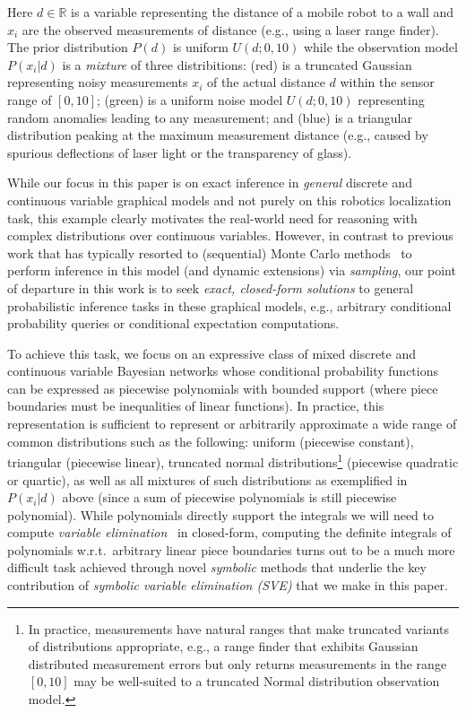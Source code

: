\documentclass[letterpaper]{article}
\newcommand{\R}{\mathbb{R}}
\begin{document}
Here $d \in \R$ is a variable representing the distance of a
mobile robot to a wall and $x_i$ are the observed measurements of
distance (e.g., using a laser range finder).  The prior distribution
$P(d)$ is uniform $U(d;0,10)$ while the observation model
$P(x_i|d)$ is a \emph{mixture} of three distribitions: (red) is a
truncated Gaussian 
representing noisy measurements $x_i$ of the actual
distance $d$ within the sensor range of $[0,10]$; 
(green) is a uniform noise model $U(d;0,10)$
representing random anomalies leading to any measurement; and
(blue) is a triangular distribution peaking at the maximum measurement
distance (e.g., caused by spurious deflections of laser light or the 
transparency of glass).

While our focus in this paper is on exact inference in \emph{general}
discrete and continuous variable graphical models and not purely on
this robotics localization task, this example clearly motivates the
real-world need for reasoning with complex distributions over
continuous variables.  However, in contrast to previous work that has
typically resorted to (sequential) Monte Carlo
methods~\cite{thrun_mcl,particle_filters} to perform inference in this
model (and dynamic extensions) via 
\emph{sampling}, our point of departure in this work is to seek \emph{exact,
closed-form solutions} to general probabilistic inference tasks in
these graphical models, e.g., arbitrary conditional probability 
queries or conditional expectation computations.

To achieve this task, we focus on an expressive class of mixed
discrete and continuous variable Bayesian networks whose conditional
probability functions can be expressed as piecewise polynomials with
bounded support (where piece boundaries must be inequalities of linear
functions).  In practice, this representation is sufficient to
represent or arbitrarily approximate a wide range of common
distributions such as the following: uniform (piecewise constant),
triangular (piecewise linear), truncated normal
distributions\footnote{In practice, measurements have natural ranges
that make truncated variants of distributions appropriate, e.g., a
range finder that exhibits Gaussian distributed measurement errors but
only returns measurements in the range $[0,10]$ may be well-suited to
a truncated Normal distribution observation model.}  (piecewise
quadratic or quartic), as well as all mixtures of such distributions
as exemplified in $P(x_i|d)$ above (since a sum of piecewise
polynomials is still piecewise polynomial).  While polynomials
directly support the integrals we will need to compute \emph{variable
elimination}~\cite{varelim} in closed-form, computing the definite
integrals of polynomials w.r.t.\ arbitrary linear piece boundaries
turns out to be a much more difficult task achieved through novel
\emph{symbolic} methods that underlie the key contribution of
\emph{symbolic variable elimination (SVE)} that we make in this paper.
\end{document}
